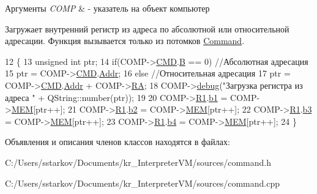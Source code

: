 \begin{DoxyParams}{Аргументы}
{\em C\+O\+MP} & -\/ указатель на объект компьютер\\
\hline
\end{DoxyParams}
Загружает внутренний регистр из адреса по абсолютной или относительной адресации. Функция вызывается только из потомков \hyperlink{class_command}{Command}. 
\begin{DoxyCode}
12 \{
13     \textcolor{keywordtype}{unsigned} \textcolor{keywordtype}{int} ptr;
14     \textcolor{keywordflow}{if}(COMP->\hyperlink{class_computer_a8423168f7cc356b4dd36977603798caf}{CMD}.\hyperlink{struct_computer_1_1command_a3e0d1e527de9f60594023a362b08a7de}{B} == 0) \textcolor{comment}{//Абсолютная адресация}
15         ptr = COMP->\hyperlink{class_computer_a8423168f7cc356b4dd36977603798caf}{CMD}.\hyperlink{struct_computer_1_1command_a0e07591012953413797506f7bc3cb1a7}{Addr};
16     \textcolor{keywordflow}{else} \textcolor{comment}{//Относительная адресация}
17         ptr = COMP->\hyperlink{class_computer_a8423168f7cc356b4dd36977603798caf}{CMD}.\hyperlink{struct_computer_1_1command_a0e07591012953413797506f7bc3cb1a7}{Addr} + COMP->\hyperlink{class_computer_a499d0b2c857c2977dd5702906705f79e}{RA};
18     COMP->\hyperlink{class_computer_a10ca6c6b200630119201de16d7368e0f}{debug}(\textcolor{stringliteral}{"Загрузка регистра из адреса "} + QString::number(ptr));
19 
20     COMP->\hyperlink{class_computer_a0fbf84599b7db9d634a92afed443ee73}{R1}.\hyperlink{union_computer_1_1data_a4308eb86abfec2d52028212c599a093b}{b1} = COMP->\hyperlink{class_computer_adcd1bd438b7ad95f043db2acbbd864ae}{MEM}[ptr++];
21     COMP->\hyperlink{class_computer_a0fbf84599b7db9d634a92afed443ee73}{R1}.\hyperlink{union_computer_1_1data_a87252409c780b1c387883eb027065709}{b2} = COMP->\hyperlink{class_computer_adcd1bd438b7ad95f043db2acbbd864ae}{MEM}[ptr++];
22     COMP->\hyperlink{class_computer_a0fbf84599b7db9d634a92afed443ee73}{R1}.\hyperlink{union_computer_1_1data_af9265f845319a83f5877590e7ab2a497}{b3} = COMP->\hyperlink{class_computer_adcd1bd438b7ad95f043db2acbbd864ae}{MEM}[ptr++];
23     COMP->\hyperlink{class_computer_a0fbf84599b7db9d634a92afed443ee73}{R1}.\hyperlink{union_computer_1_1data_aca2c60d7da9da79750a6d3a237dae93c}{b4} = COMP->\hyperlink{class_computer_adcd1bd438b7ad95f043db2acbbd864ae}{MEM}[ptr++];    
24 \}
\end{DoxyCode}


Объявления и описания членов классов находятся в файлах\+:\begin{DoxyCompactItemize}
\item 
C\+:/\+Users/sstarkov/\+Documents/kr\+\_\+\+Interpreter\+V\+M/sources/command.\+h\item 
C\+:/\+Users/sstarkov/\+Documents/kr\+\_\+\+Interpreter\+V\+M/sources/command.\+cpp\end{DoxyCompactItemize}
